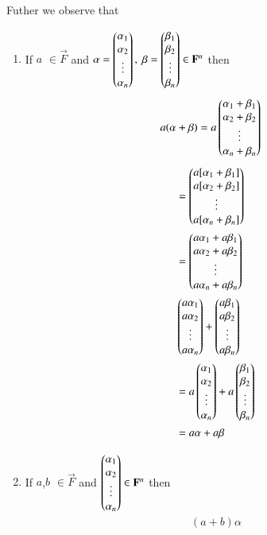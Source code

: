 \documentclass[journal,12pt,twocolumn]{IEEEtran}
\begin{document}
Futher we observe that
\begin{enumerate}
\item If $a$ $\in \vec{F}$ and 
	$\mathbf{\alpha} = \begin{pmatrix}\alpha_1\\ \alpha_2\\ \vdots\\ \alpha_n\end{pmatrix}, \
	\mathbf{\beta}=\begin{pmatrix}\beta_1\\ \beta_2\\ \vdots\\ \beta_n\end{pmatrix} \in \mathbf{F}^n$ 
then
\begin{align}
	a(\mathbf{\alpha}+\mathbf{\beta}) &=
	a\begin{pmatrix}\alpha_1+\beta_1\\ \alpha_2+\beta_2\\ \vdots\\ 
			\alpha_n+\beta_n\end{pmatrix} 
\end{align}
\begin{align}
	&=\begin{pmatrix}a[\alpha_1+\beta_1]\\ a[\alpha_2+\beta_2]\\ \vdots\\
			a[\alpha_n+\beta_n]\end{pmatrix} \\
	&=\begin{pmatrix}a\alpha_1+a\beta_1\\ a\alpha_2+a\beta_2\\ \vdots\\ 
			a\alpha_n+a\beta_n\end{pmatrix} \\
	&\begin{pmatrix}a\alpha_1\\ a\alpha_2\\ \vdots\\ a\alpha_n\end{pmatrix}
	+ \begin{pmatrix}a\beta_1\\ a\beta_2\\ \vdots\\ a\beta_n\end{pmatrix} \\
	&=a\begin{pmatrix}\alpha_1\\ \alpha_2\\ \vdots\\ \alpha_n\end{pmatrix}
	+ a\begin{pmatrix}\beta_1\\ \beta_2\\ \vdots\\ \beta_n\end{pmatrix} \\
	&=a\alpha+a\beta
\end{align}
\item If $a$,$b$ $\in \vec{F}$ and 
	$\begin{pmatrix}\alpha_1\\ \alpha_2\\ \vdots\\ \alpha_n\end{pmatrix} \in \mathbf{F}^n$ then
\begin{align}
	(a+b)\alpha

\end{align}
\end{enumerate}
\end{document}
